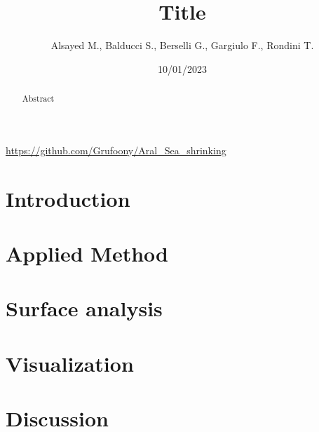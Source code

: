 \documentclass[12pt,a4paper]{article}
\title{Title}
\author{Alsayed M., Balducci S., Berselli G., Gargiulo F., Rondini T.}
\date{10/01/2023}
\begin{document}
\maketitle
\begin{center}
	\url{https://github.com/Grufoony/Aral_Sea_shrinking}
\end{center}

\begin{abstract}
    Abstract
\end{abstract}
\thispagestyle{empty}

\newpage
\thispagestyle{empty}
\addtocounter{page}{-2}
\mbox{}

\tableofcontents
\pagebreak

\section*{Introduction}

\pagebreak

\section{Applied Method}

\pagebreak

\section{Surface analysis}

\pagebreak

\section{Visualization}

\pagebreak

\section{Discussion}


\newpage
\thispagestyle{empty}
\mbox{}

\appendix
\end{document}
